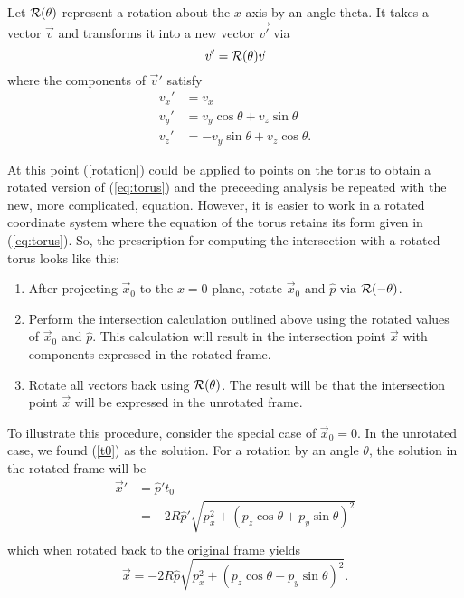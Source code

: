 \documentclass{article}
\newcommand{\eq}[1]{(\ref{#1})}
\newcommand{\p}{\hat{p}}
\newcommand{\x}{\vec{x}}
\begin{document}
 Let ${\cal R}(\theta)$ represent a rotation about the $x$ axis by an angle
 theta.  It takes a vector $\vec{v}$ and transforms it into a new vector
 $\vec{v'}$ via 
\begin{equation}
   \vec{v}' = {\cal R}(\theta) \vec{v} \label{rotation}
\end{equation}
 where the components of $\vec{v}'$ satisfy
\begin{align}
   v_x' &= v_x \nonumber \\
   v_y' &= v_y \cos\theta + v_z \sin\theta \\
   v_z' &= -v_y \sin\theta + v_z\cos\theta.
\end{align}

 At this point \eq{rotation} could be applied to points on the torus to
 obtain a rotated version of \eq{eq:torus} and the preceeding analysis be
 repeated with the new, more complicated, equation.  However, it is easier
 to work in a rotated coordinate system where the equation of the torus
 retains its form given in \eq{eq:torus}.  So, the prescription for
 computing the intersection with a rotated torus looks like this:
\begin{enumerate}
  \item  After projecting $\x_0$ to the $x = 0$ plane, rotate $\x_0$ and $\p$
  via ${\cal R}(-\theta)$.
  \item  Perform the intersection calculation outlined above using the
  rotated values of $\x_0$ and $\p$.  This calculation will result in the
  intersection point $\x$ with components expressed in the rotated frame.
  \item Rotate all vectors back using ${\cal R}(\theta)$.  The result will
  be that the intersection point $\x$ will be expressed in the unrotated
  frame. 
\end{enumerate}

 To illustrate this procedure, consider the special case of $\x_0 = 0$.  In
 the unrotated case, we found \eq{t0} as the solution.  For a rotation by an
 angle $\theta$, the solution in the rotated frame will be
\begin{align}
    \x' &= \p' t_0  \nonumber \\
                 &= -2R \p' \sqrt{p_x^2 + (p_z\cos\theta + p_y\sin\theta)^2}
                     \nonumber \\
\end{align}
which when rotated back to the original frame yields
\begin{equation} 
    \x = -2R \p\sqrt{p_x^2 + (p_z\cos\theta - p_y\sin\theta)^2}
                     \nonumber.
\end{equation}
 
\end{document}
